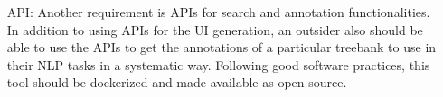 \begin{itemize}[before=\normalfont, font=\itshape, align=left]
\item[API:]
Another requirement is APIs for search and annotation functionalities.
In addition to using APIs for the UI generation, an outsider also should be able to use the APIs to get the annotations of a particular treebank to use in their NLP tasks in a systematic way.
Following good software practices, this tool should be dockerized and made available as open source.
\end{itemize}
